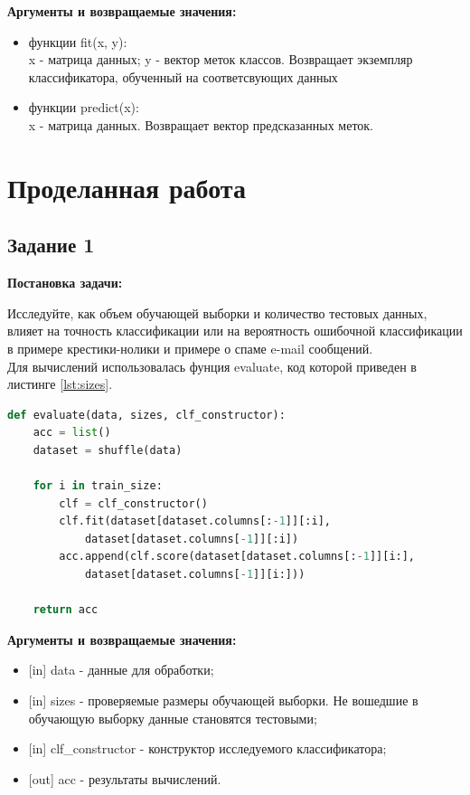 \documentclass[a4paper,14pt]{article}
\begin{document}
\textbf{Аргументы и возвращаемые значения:}
\begin{itemize}
	\item функции fit(x, y):\\ x - матрица данных; y - вектор меток классов. Возвращает экземпляр классификатора, обученный на соответсвующих данных
	\item функции predict(x): \\ x - матрица данных. Возвращает вектор предсказанных меток.
\end{itemize}

\section{Проделанная работа}

\subsection{Задание 1}

\textbf{Постановка задачи:}

Исследуйте, как объем обучающей выборки и количество тестовых данных, влияет на точность классификации или на вероятность ошибочной классификации в примере крестики-нолики и примере о спаме e-mail сообщений.\\

Для вычислений использовалась фунция evaluate, код которой приведен в листинге \ref{lst:sizes}.

\begin{lstlisting}[caption={Использование байесовского классификатора из пакета scikit-learn}, label={lst:sizes}, language=Python]
def evaluate(data, sizes, clf_constructor):
	acc = list()
	dataset = shuffle(data)

	for i in train_size:
		clf = clf_constructor()
		clf.fit(dataset[dataset.columns[:-1]][:i],
			dataset[dataset.columns[-1]][:i])
		acc.append(clf.score(dataset[dataset.columns[:-1]][i:],
			dataset[dataset.columns[-1]][i:]))

	return acc
\end{lstlisting}

\textbf{Аргументы и возвращаемые значения:}
\begin{itemize}
	\item {[in]} data - данные для обработки;
	\item {[in]} sizes - проверяемые размеры обучающей выборки. Не вошедшие в обучающую выборку данные становятся тестовыми;
	\item {[in]} clf\_constructor - конструктор исследуемого классификатора;
	\item {[out]} acc - результаты вычислений.
\end{itemize}
\end{document}
